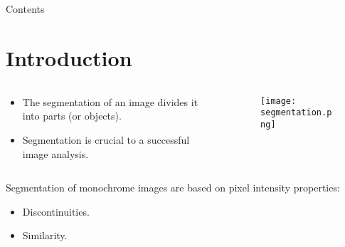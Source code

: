 


\subtitle{Segmentation}





\begin{frame}
\titlepage %
\end{frame}


\begin{frame}{Contents}
\setcounter{tocdepth}{1}
\tableofcontents
\end{frame}


\section{Introduction}

\begin{frame}
\begin{columns}
\begin{column}{.5\textwidth}
\begin{itemize}
\item The segmentation of an image divides it into parts (or objects).
\item Segmentation is crucial to a successful image analysis.
\end{itemize}
\end{column}
\begin{column}{.5\textwidth}
\begin{figure}[!h]
\texttt{[image: segmentation.png]}
\end{figure}
\end{column}
\end{columns}
\end{frame}

\begin{frame}
Segmentation of monochrome images are based on pixel intensity properties:
\begin{itemize}
\item Discontinuities.
\item Similarity.
\end{itemize}
\end{frame}


